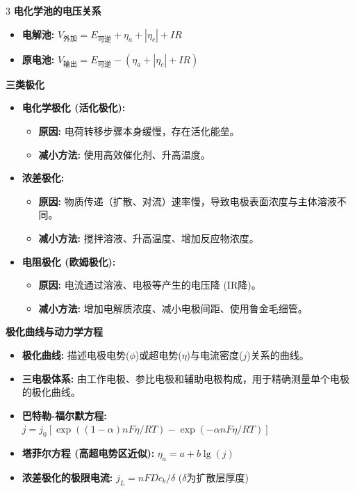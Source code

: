 \documentclass[a4paper,6pt]{article} %
\begin{document}
\begin{multicols}{3}
\textbf{电化学池的电压关系}
\begin{itemize}
    \item \textbf{电解池:} $V_{\text{外加}} = E_{\text{可逆}} + \eta_a + |\eta_c| + IR$
    \item \textbf{原电池:} $V_{\text{输出}} = E_{\text{可逆}} - (\eta_a + |\eta_c| + IR)$
\end{itemize}

\textbf{三类极化}
\begin{itemize}
    \item \textbf{电化学极化 (活化极化):}
    \begin{itemize}
        \item \textbf{原因:} 电荷转移步骤本身缓慢，存在活化能垒。
        \item \textbf{减小方法:} 使用高效催化剂、升高温度。
    \end{itemize}
    \item \textbf{浓差极化:}
    \begin{itemize}
        \item \textbf{原因:} 物质传递（扩散、对流）速率慢，导致电极表面浓度与主体溶液不同。
        \item \textbf{减小方法:} 搅拌溶液、升高温度、增加反应物浓度。
    \end{itemize}
    \item \textbf{电阻极化 (欧姆极化):}
    \begin{itemize}
        \item \textbf{原因:} 电流通过溶液、电极等产生的电压降 (IR降)。
        \item \textbf{减小方法:} 增加电解质浓度、减小电极间距、使用鲁金毛细管。
    \end{itemize}
\end{itemize}

\textbf{极化曲线与动力学方程}
\begin{itemize}
    \item \textbf{极化曲线:} 描述电极电势($\phi$)或超电势($\eta$)与电流密度($j$)关系的曲线。
    \item \textbf{三电极体系:} 由工作电极、参比电极和辅助电极构成，用于精确测量单个电极的极化曲线。
    \item \textbf{巴特勒-福尔默方程:} $j = j_0 [\exp((1-\alpha)nF\eta/RT) - \exp(-\alpha nF\eta/RT)]$
    \item \textbf{塔菲尔方程 (高超电势区近似):} $\eta_a = a + b \lg(j)$
    \item \textbf{浓差极化的极限电流:} $j_L = nFDc_b / \delta$ ($\delta$为扩散层厚度)
\end{itemize}


\end{multicols}
\end{document}
